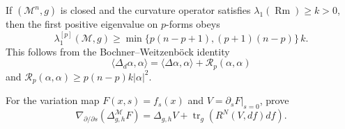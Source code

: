 \begin{theorem}
\label{thm:chow-iv-k28-gallot-meyer}


If $(\mathcal M^n,g)$ is closed and the curvature operator satisfies
$\lambda_1(\operatorname{Rm})\ge k>0$, then the first positive eigenvalue on
$p$-forms obeys
\[
\lambda_1^{[p]}(\mathcal M,g)\ge
\min\{p(n-p+1),(p+1)(n-p)\}\,k.
\]
This follows from the Bochner--Weitzenböck identity
\[
\langle\Delta_d\alpha,\alpha\rangle
=\langle\Delta\alpha,\alpha\rangle+\mathcal R_p(\alpha,\alpha)
\]
and $\mathcal R_p(\alpha,\alpha)\ge p(n-p)k|\alpha|^2$.
\end{theorem}

\begin{example}
\label{ex:chow-iv-k16-map-laplacian-linearization}
For the variation map $F(x,s)=f_s(x)$ and $V=\partial_sF|_{s=0}$, prove
\[
\nabla_{\partial/\partial s}(\Delta_{g,h}^{\mathcal M}F)
=\Delta_{g,h}V+\operatorname{tr}_g(R^N(V,df)df).
\]
\end{example}
